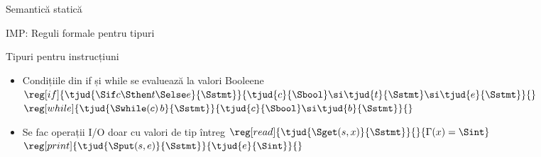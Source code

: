 \documentclass[xcolor=pdftex,romanian,colorlinks]{beamer}
\begin{document}
\begin{section}{Semantică statică}
  \begin{frame}{IMP: Reguli formale pentru tipuri}
    \begin{block}{Tipuri pentru instrucțiuni}
        \begin{itemize}
        \item Condițiile din if și while se evaluează la valori Booleene
    \vitem[] $\reg[if]{\tjud{\Sif c \Sthen t \Selse e}{\Sstmt}}{\tjud{c}{\Sbool} \si \tjud{t}{{\Sstmt}} \si \tjud{e}{\Sstmt}}{}$
    \vitem[] $\reg[while]{\tjud{\Swhile (c)\,b}{\Sstmt}}{\tjud{c}{\Sbool} \si \tjud{b}{\Sstmt}}{}$
        \item Se fac operații I/O doar cu valori de tip întreg
    \vitem[] $\reg[read]{\tjud{\Sget (s, x)}{\Sstmt}}{}{\Gamma(x) = \Sint}$
    \vitem[] $\reg[print]{\tjud{\Sput (s, e)}{\Sstmt}}{\tjud{e}{\Sint}}{}$
    \end{itemize}
  \end{block}
    \end{frame}

\end{section}
\end{document}
